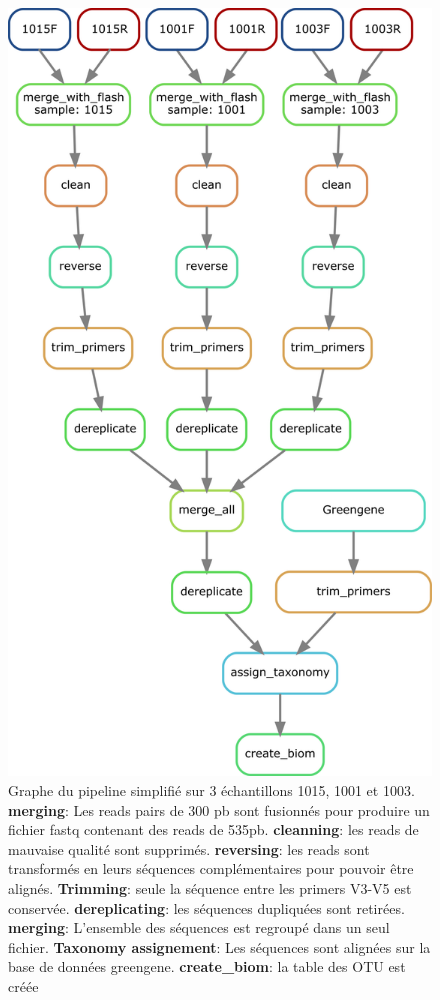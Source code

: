 \documentclass[12pt,a4paper]{article}
\begin{document}
\begin{figure}[!ht]
\begin{center}
\includegraphics[scale=0.5]{img/pipeline_trio.png}\hfill
\end{center}
\caption{Graphe du pipeline simplifié sur 3 échantillons 1015, 1001 et 1003.\\ \textbf{merging}: Les reads pairs de 300 pb sont fusionnés  pour produire un fichier fastq contenant des reads de 535pb. \textbf{cleanning}: les reads de mauvaise qualité sont supprimés. \textbf{reversing}: les reads sont transformés en leurs séquences complémentaires pour pouvoir être alignés. \textbf{Trimming}: seule la séquence entre les primers V3-V5 est conservée. \textbf{dereplicating}: les séquences dupliquées sont retirées. \textbf{merging}: L'ensemble des séquences est regroupé dans un seul fichier. \textbf{Taxonomy assignement}: Les séquences sont alignées sur la base de données greengene. \textbf{create\_biom}: la table des OTU est créée }
\label{pipeline_trio}
\end{figure}
\end{document}
